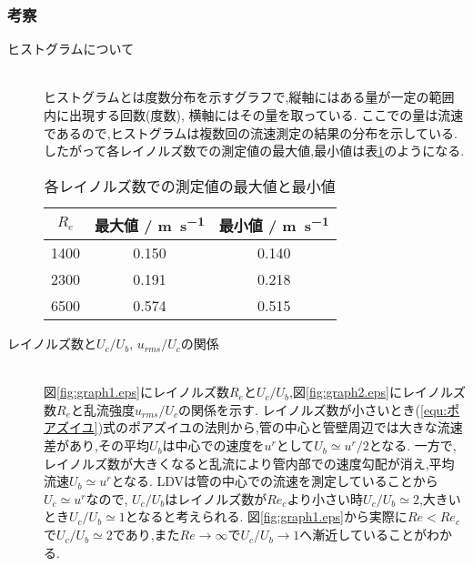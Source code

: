 \subsubsection{考察}
\begin{description}
  \item[ヒストグラムについて]\mbox{}\\
  ヒストグラムとは度数分布を示すグラフで,縦軸にはある量が一定の範囲内に出現する回数(度数), 横軸にはその量を取っている. 
  ここでの量は流速であるので,ヒストグラムは複数回の流速測定の結果の分布を示している.
  したがって各レイノルズ数での測定値の最大値,最小値は表\ref{tab:maxmin}のようになる.
  \begin{table}[h]
     \caption{各レイノルズ数での測定値の最大値と最小値}
     \label{tab:maxmin}
     \centering
     \begin{tabular}{ccc}
       \hline
       $R_e$&最大値 / \si{\metre.\second^{-1}}&最小値 / \si{\metre.\second^{-1}}\\
       \hline \hline
       1400&0.150&0.140\\
       2300&0.191&0.218\\
       6500&0.574&0.515\\
       \hline
     \end{tabular}
  \end{table}
  \item[レイノルズ数と$U_c/U_b$, $u_{rms}/U_c$の関係]\mbox{}\\
  図\ref{fig:graph1.eps}にレイノルズ数$R_e$と$U_c/U_b$,図\ref{fig:graph2.eps}にレイノルズ数$R_e$と乱流強度$u_{rms}/U_c$の関係を示す.
  レイノルズ数が小さいとき(\ref{equ:ポアズイユ})式のポアズイユの法則から,管の中心と管壁周辺では大きな流速差があり,その平均$U_b$は中心での速度を$u^r$として$U_b\simeq u^r/2$となる.
  一方で,レイノルズ数が大きくなると乱流により管内部での速度勾配が消え,平均流速$U_b\simeq u^r$となる.
  LDVは管の中心での流速を測定していることから$U_c\simeq u^r$なので,
  $U_c/U_b$はレイノルズ数が$Re_c$より小さい時$U_c/U_b\simeq 2$,大きいとき$U_c/U_b\simeq 1$となると考えられる.
  図\ref{fig:graph1.eps}から実際に$Re < Re_c$で$U_c/U_b\simeq 2$であり,また$Re\rightarrow\infty$で$U_c/U_b\rightarrow 1$へ漸近していることがわかる.


\end{description}
